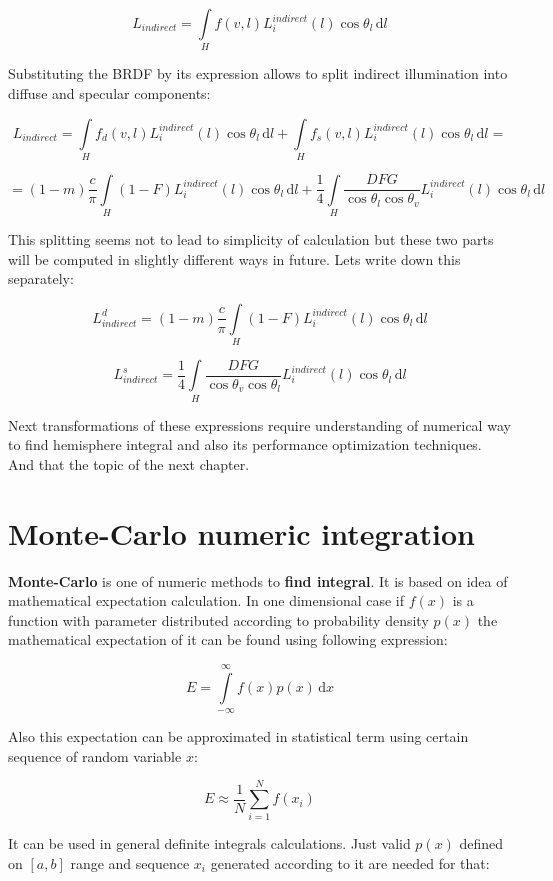 \[L_{indirect} = \int\limits_H f(v, l) L_i^{indirect}(l) \cos\theta_l\, \mathrm{d}l\]

Substituting the B\+R\+DF by its expression allows to split indirect illumination into diffuse and specular components\+:

\[L_{indirect} = \int\limits_H f_d(v,l)L_i^{indirect}(l)\cos\theta_l\, \mathrm{d}l + \int\limits_H f_s(v,l)L_i^{indirect}(l)\cos\theta_l\, \mathrm{d}l = \]

\[= (1-m)\frac{c}{\pi}\int\limits_H (1-F)L_i^{indirect}(l)\cos\theta_l\, \mathrm{d}l + \frac{1}{4}\int\limits_H \frac{DFG}{\cos\theta_l \cos\theta_v}L_i^{indirect}(l)\cos\theta_l\, \mathrm{d}l\]

This splitting seems not to lead to simplicity of calculation but these two parts will be computed in slightly different ways in future. Lets write down this separately\+:

\[L_{indirect}^d = (1-m)\frac{c}{\pi}\int\limits_H (1-F)L_i^{indirect}(l)\cos\theta_l\, \mathrm{d}l\]

\[L_{indirect}^s = \frac{1}{4}\int\limits_H \frac{DFG}{\cos\theta_v \cos\theta_l} L_i^{indirect}(l) \cos\theta_l\, \mathrm{d}l\]

Next transformations of these expressions require understanding of numerical way to find hemisphere integral and also its performance optimization techniques. And that the topic of the next chapter.\hypertarget{specification__pbr_math_pbr_monte_carlo_integration}{}\section{Monte-\/\+Carlo numeric integration}\label{specification__pbr_math_pbr_monte_carlo_integration}
{\bfseries Monte-\/\+Carlo} is one of numeric methods to {\bfseries find integral}. It is based on idea of mathematical expectation calculation. In one dimensional case if $f(x)$ is a function with parameter distributed according to probability density $p(x)$ the mathematical expectation of it can be found using following expression\+:

\[E = \int\limits_{-\infty}^\infty f(x) p(x)\, \mathrm{d}x\]

Also this expectation can be approximated in statistical term using certain sequence of random variable $x$\+:

\[E \approx \frac{1}{N} \sum_{i=1}^{N} f(x_i)\]

It can be used in general definite integrals calculations. Just valid $p(x)$ defined on $[a, b]$ range and sequence $x_i$ generated according to it are needed for that\+:


